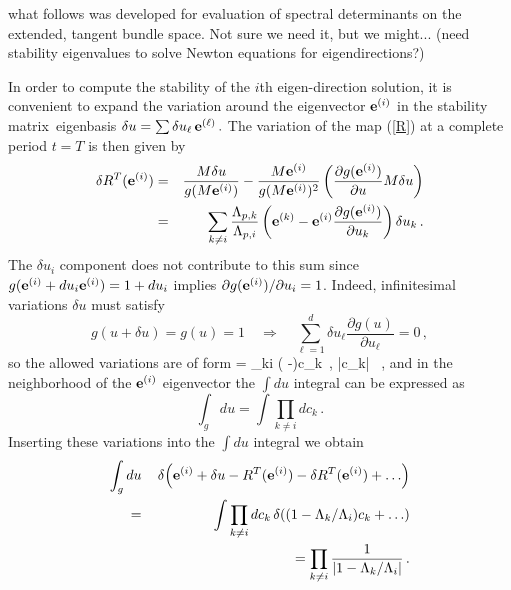  what follows was developed for evaluation
of spectral determinants on the extended, tangent bundle space. Not
sure we need it, but we might... (need stability eigenvalues
to solve Newton equations for eigendirections?)

In order to
compute the stability of the $i$th eigen-direction solution, it
is convenient to expand the variation around the eigenvector
$\jEigvec[i]$ in the stability matrix\ eigenbasis
$
\delta {u} = \sum \delta u_\ell \, \jEigvec[\ell]
\, .
$
The variation of the map (\ref{R}) at a complete period $t=T$
is then given by
\begin{eqnarray}
\delta R^T (\jEigvec[i])  &=&
\frac{\monodromy \delta{u}}{g(\monodromy \jEigvec[i])}
-\frac{\monodromy \jEigvec[i] }{g(\monodromy \jEigvec[i])^2}
\left(
 \frac{\partial g(\jEigvec[i])}{\partial {u}}
	 \monodromy  \delta{u}
\right)
			\nonumber \\
	&=&
\sum_{k \neq i} \frac{\ExpaEig_{p,k} }{ \ExpaEig_{p,i }}
 \left( \jEigvec[k] -\jEigvec[i]
       \frac{\partial g(\jEigvec[i])}{\partial u_k}\right)\delta u_k
\, .
\label{var_R}
\end{eqnarray}
The $\delta u_i$ component does not contribute to this sum
since $g(\jEigvec[i]+du_i\jEigvec[i])=1+du_i$ implies $\partial
g(\jEigvec[i]) / \partial u_i = 1$. Indeed, infinitesimal
variations $\delta{u}$ must satisfy
\[
g({u}+\delta{u})=g({u})=1 \quad \Longrightarrow \quad
\sum_{\ell=1}^d \delta u_\ell
	  \frac{ \partial g({u})}{\partial u_\ell} = 0
\,,
\]
so the allowed variations are of form
\beq
{} = \sum_{k\neq i}
		\left( \jEigvec[k] -\jEigvec[i]
              \right)c_k
    \,, \quad |c_k| 
\, ,
and in the neighborhood of the $\jEigvec[i]$ eigenvector
the $\int d{u}$ integral can be expressed as
\[
\int_g d{u} = \int \prod_{k\neq i} dc_k
\, .
\]
%
Inserting these variations into the $\int d{u}$ integral we obtain
\begin{eqnarray}
\int_g d{u}\, &&
\prpgtr{ \jEigvec[i]+\delta{u} -R^{T}(\jEigvec[i])
				-\delta R^T(\jEigvec[i]) + \dots}
	\nonumber \\
= \, && \int \prod_{k\neq i} dc_k \,
	\prpgtr{(1-\ExpaEig_{k}/\ExpaEig_{i}) c_k + \dots }
	\nonumber \\
	&&= \prod_{k\neq i} \frac{ 1}{ \left| 1-
			{\ExpaEig_{k} / \ExpaEig_{i } }\right|}
\, .
\nonumber
\end{eqnarray}
